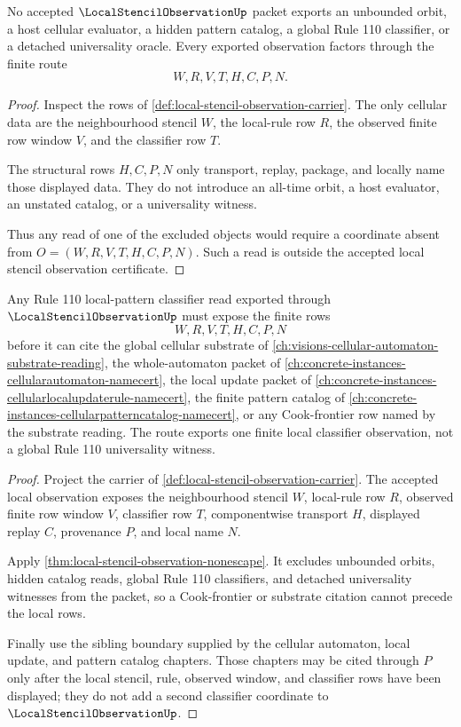 \begin{theorem}
\label{thm:local-stencil-observation-nonescape}
No accepted $\LocalStencilObservationUp$ packet exports an unbounded orbit, a host cellular evaluator, a hidden pattern catalog, a global Rule 110 classifier, or a detached universality oracle. Every exported observation factors through the finite route
$$
W,R,V,T,H,C,P,N .
$$
\end{theorem}
\begin{proof}
Inspect the rows of \autoref{def:local-stencil-observation-carrier}. The only cellular data are the neighbourhood stencil $W$, the local-rule row $R$, the observed finite row window $V$, and the classifier row $T$.

The structural rows $H,C,P,N$ only transport, replay, package, and locally name those displayed data. They do not introduce an all-time orbit, a host evaluator, an unstated catalog, or a universality witness.

Thus any read of one of the excluded objects would require a coordinate absent from $O=(W,R,V,T,H,C,P,N)$. Such a read is outside the accepted local stencil observation certificate.
\end{proof}

\begin{theorem}
\label{thm:local-stencil-observation-rule110-classifier-route}
Any Rule 110 local-pattern classifier read exported through $\LocalStencilObservationUp$ must expose the finite rows
$$
W,R,V,T,H,C,P,N
$$
before it can cite the global cellular substrate of \autoref{ch:visions-cellular-automaton-substrate-reading}, the whole-automaton packet of \autoref{ch:concrete-instances-cellularautomaton-namecert}, the local update packet of \autoref{ch:concrete-instances-cellularlocalupdaterule-namecert}, the finite pattern catalog of \autoref{ch:concrete-instances-cellularpatterncatalog-namecert}, or any Cook-frontier row named by the substrate reading. The route exports one finite local classifier observation, not a global Rule 110 universality witness.
\end{theorem}
\begin{proof}
Project the carrier of \autoref{def:local-stencil-observation-carrier}. The accepted local observation exposes the neighbourhood stencil $W$, local-rule row $R$, observed finite row window $V$, classifier row $T$, componentwise transport $H$, displayed replay $C$, provenance $P$, and local name $N$.

Apply \autoref{thm:local-stencil-observation-nonescape}. It excludes unbounded orbits, hidden catalog reads, global Rule 110 classifiers, and detached universality witnesses from the packet, so a Cook-frontier or substrate citation cannot precede the local rows.

Finally use the sibling boundary supplied by the cellular automaton, local update, and pattern catalog chapters. Those chapters may be cited through $P$ only after the local stencil, rule, observed window, and classifier rows have been displayed; they do not add a second classifier coordinate to $\LocalStencilObservationUp$.
\end{proof}

